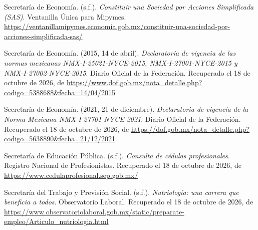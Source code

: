 \documentclass[12pt, a4paper]{article}
\begin{document}
\begin{list}{}{\setlength{\leftmargin}{1.27cm}\setlength{\itemindent}{-1.27cm}%
  \setlength{\labelwidth}{0pt}\setlength{\labelsep}{0pt}\setlength{\itemsep}{6pt}}
\item Secretaría de Economía. (s.f.). \textit{Constituir una Sociedad por
  Acciones Simplificada (SAS)}. Ventanilla Única para Mipymes.
  \url{https://ventanillamipymes.economia.gob.mx/constituir-una-sociedad-por-acciones-simplificada-sas/}
 

\item Secretaría de Economía. (2015, 14 de abril). \textit{Declaratoria
  de vigencia de las normas mexicanas NMX-I-25021-NYCE-2015,
  NMX-I-27001-NYCE-2015 y NMX-I-27002-NYCE-2015}. Diario Oficial de
  la Federación.
  Recuperado el 18 de octubre de 2026, de \url{https://www.dof.gob.mx/nota_detalle.php?codigo=5388688&fecha=14/04/2015}
 
 
\item Secretaría de Economía. (2021, 21 de diciembre).
  \textit{Declaratoria de vigencia de la Norma Mexicana
  NMX-I-27701-NYCE-2021}. Diario Oficial de la Federación.
  Recuperado el 18 de octubre de 2026, de \url{https://dof.gob.mx/nota_detalle.php?codigo=5638890&fecha=21/12/2021}
 

\item Secretaría de Educación Pública. (s.f.). \textit{Consulta de
  cédulas profesionales}. Registro Nacional de Profesionistas.
  Recuperado el 18 de octubre de 2026, de \url{https://www.cedulaprofesional.sep.gob.mx/}
 

\item Secretaría del Trabajo y Previsión Social. (s.f.).
  \textit{Nutriología: una carrera que beneficia a todos}. Observatorio
Laboral. Recuperado el 18 de octubre de 2026, de \url{https://www.observatoriolaboral.gob.mx/static/preparate-empleo/Articulo_nutriologia.html}

 

\end{list}
\end{document}

